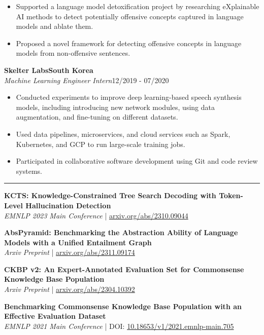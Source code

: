\documentclass[10pt,a4paper]{article}
\newcommand{\sectiontitle}[1]{%
  \par\vspace{4pt}%
  \noindent{\bfseries\fontsize{10.3}{12}\selectfont #1}\par
  \vspace{1.5pt}\hrule\vspace{2pt}%
}
\newcommand{\job}[4]{\noindent\textbf{#1}\hfill\textbf{#2}\\[0.5pt]\textit{#3}\hfill #4\par\vspace{1pt}}
\begin{document}
\begin{itemize}
  \item Supported a language model detoxification project by researching eXplainable AI methods to detect potentially offensive concepts captured in language models and ablate them.
  \item Proposed a novel framework for detecting offensive concepts in language models from non-offensive sentences.
\end{itemize}
\job{Skelter Labs}{South Korea}{Machine Learning Engineer Intern}{12/2019 - 07/2020}
\begin{itemize}
  \item Conducted experiments to improve deep learning-based speech synthesis models, including introducing new network modules, using data augmentation, and fine-tuning on different datasets.
  \item Used data pipelines, microservices, and cloud services such as Spark, Kubernetes, and GCP to run large-scale training jobs.
  \item Participated in collaborative software development using Git and code review systems.
\end{itemize}

\sectiontitle{PUBLICATIONS}
\textbf{KCTS: Knowledge-Constrained Tree Search Decoding with Token-Level Hallucination Detection}\\[-1.5pt]
\textit{EMNLP 2023 Main Conference} | \href{https://arxiv.org/abs/2310.09044}{arxiv.org/abs/2310.09044}\par
\textbf{AbsPyramid: Benchmarking the Abstraction Ability of Language Models with a Unified Entailment Graph}\\[-1.5pt]
\textit{Arxiv Preprint} | \href{https://arxiv.org/abs/2311.09174}{arxiv.org/abs/2311.09174}\par
\textbf{CKBP v2: An Expert-Annotated Evaluation Set for Commonsense Knowledge Base Population}\\[-1.5pt]
\textit{Arxiv Preprint} | \href{https://arxiv.org/abs/2304.10392}{arxiv.org/abs/2304.10392}\par
\textbf{Benchmarking Commonsense Knowledge Base Population with an Effective Evaluation Dataset}\\[-1.5pt]
\textit{EMNLP 2021 Main Conference} | DOI: \href{https://doi.org/10.18653/v1/2021.emnlp-main.705}{10.18653/v1/2021.emnlp-main.705}
\end{document}
